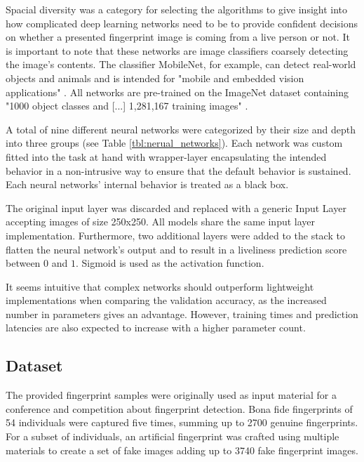 Spacial diversity was a category for selecting the algorithms to give insight into how complicated deep learning networks need to be to provide confident decisions on whether a presented fingerprint image is coming from a live person or not.
It is important to note that these networks are image classifiers coarsely detecting the image's contents.
The classifier MobileNet, for example, can detect real-world objects and animals and is intended for "mobile and embedded vision applications" \cite{MBNET}.
All networks are pre-trained on the ImageNet dataset containing "1000 object classes and [...] 1,281,167 training images" \cite{ImageNet}. 





A total of nine different neural networks were categorized by their size and depth into three groups (see Table \ref{tbl:nerual_networks}).
Each network was custom fitted into the task at hand with wrapper-layer encapsulating the intended behavior in a non-intrusive way to ensure that the default behavior is sustained.
Each neural networks' internal behavior is treated as a black box.

The original input layer was discarded and replaced with a generic Input Layer accepting images of size 250x250. All models share the same input layer implementation.
Furthermore, two additional layers were added to the stack to flatten the neural network's output and to result in a liveliness prediction score between $0$ and $1$.
Sigmoid is used as the activation function.

It seems intuitive that complex networks should outperform lightweight implementations when comparing the validation accuracy, as the increased number in parameters gives an advantage.
However, training times and prediction latencies are also expected to increase with a higher parameter count.



\subsection{Dataset}
The provided fingerprint samples were originally used as input material for a conference and competition about fingerprint detection.
Bona fide fingerprints of 54 individuals were captured five times, summing up to 2700 genuine fingerprints.
For a subset of individuals, an artificial fingerprint was crafted using multiple materials to create a set of fake images adding up to 3740 fake fingerprint images.


